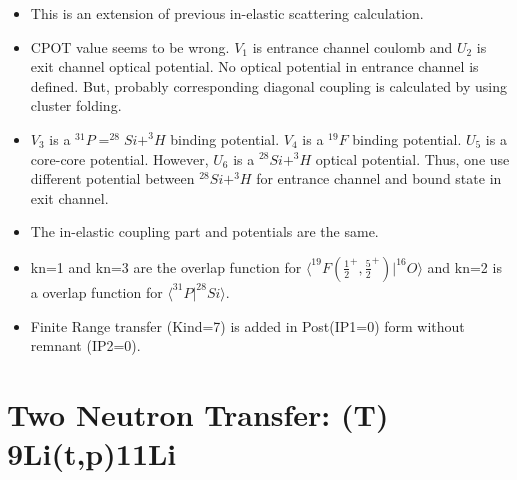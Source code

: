\documentclass[11pt]{book}
\def\la{\langle}
\def\ra{\rangle}
\begin{document}
\begin{itemize}
\item This is an extension of previous in-elastic scattering calculation. 
\item CPOT value seems to be wrong. $V_1$ is entrance channel coulomb
      and $U_2$ is exit channel optical potential. No optical potential 
      in entrance channel is defined. But, probably corresponding 
      diagonal coupling is calculated by using cluster folding. 
\item $V_3$ is a $^{31}P=^{28}Si+^3H$ binding potential. $V_4$ is a $^{19}F$ binding potential. 
      $U_5$ is a core-core potential. However, $U_6$ is a $^{28}Si+^3H$ optical potential.
      Thus, one use different potential between $^{28}Si+^3H$ for entrance channel
      and bound state in exit channel. 
      
\item The in-elastic coupling part and potentials are the same.  
\item kn=1 and kn=3 are the overlap function for $\la^{19}F(\frac{1}{2}^+,\frac{5}{2}^+)|^{16}O\ra$
 and kn=2 is a overlap function for $\la ^{31}P|^{28}Si\ra$.
\item Finite Range transfer (Kind=7) is added in Post(IP1=0)  form without remnant
      (IP2=0). 
\end{itemize}

\section{Two Neutron Transfer: (T) 9Li(t,p)11Li}
\end{document}
